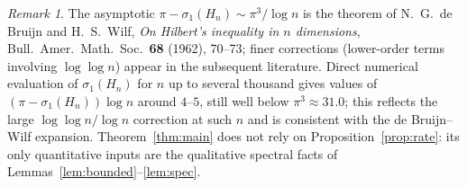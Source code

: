 \documentclass[12pt]{article}
\theoremstyle{remark}
\newtheorem*{remark}{Remark}
\begin{document}
\begin{remark}
The asymptotic $\pi-\sigma_1(H_n)\sim\pi^3/\log n$ is the theorem of N.~G.~de Bruijn and
H.~S.~Wilf, \emph{On Hilbert's inequality in $n$ dimensions}, Bull.\ Amer.\ Math.\ Soc.\
\textbf{68} (1962), 70--73; finer corrections (lower-order terms involving $\log\log n$) appear in
the subsequent literature. Direct numerical evaluation of $\sigma_1(H_n)$ for $n$ up to several
thousand gives values of $(\pi-\sigma_1(H_n))\log n$ around $4$--$5$, still well below
$\pi^3\approx31.0$; this reflects the large $\log\log n/\log n$ correction at such $n$ and is
consistent with the de Bruijn--Wilf expansion. Theorem~\ref{thm:main} does not rely on
Proposition~\ref{prop:rate}: its only quantitative inputs are the qualitative spectral facts of
Lemmas~\ref{lem:bounded}--\ref{lem:spec}.
\end{remark}
\end{document}
